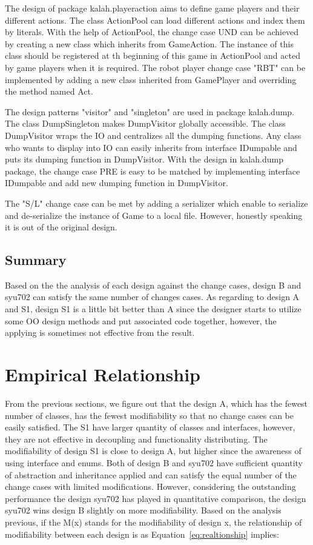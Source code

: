 \documentclass[conference]{IEEEtran}
\begin{document}
	The design of package kalah.playeraction aims to define game players and their different actions. The class ActionPool can load different actions and index them by literals. With the help of ActionPool, the change case UND can be achieved by creating a new class which inherits from GameAction. The instance of this class should be registered at th beginning of this game in ActionPool and acted by game players when it is required. The robot player change case "RBT" can be implemented by adding a new class inherited from GamePlayer and overriding the method named Act.
	
	The design patterns "visitor" and "singleton" are used in package kalah.dump. The class DumpSingleton makes DumpVisitor globally accessible. The class DumpVisitor wraps the IO and centralizes all the dumping functions. Any class who wants to display into IO can easily inherits from interface IDumpable and puts its dumping function in DumpVisitor. With the design in kalah.dump package, the change case PRE is easy to be matched by implementing interface IDumpable and add new dumping function in DumpVisitor.
	
	The "S/L" change case can be met by adding a serializer which enable to serialize and de-serialize the instance of Game to a local file. However, honestly speaking it is out of the original design.
	
	\subsection{Summary}
	Based on the the analysis of each design against the change cases, design B and syu702 can satisfy the same number of changes cases. As regarding to design A and S1, design S1 is a little bit better than A since the designer starts to utilize some \gls{OO} design methods and put associated code together, however, the applying is sometimes not effective from the result.
	
	\section{Empirical Relationship}
	From the previous sections, we figure out that the design A, which has the fewest number of classes, has the fewest modifiability so that no change cases can be easily satisfied. The S1 have larger quantity of classes and interfaces, however, they are not effective in decoupling and functionality distributing. The modifiability of design S1 is close to design A, but higher since the awareness of using interface and enums. Both of design B and syu702 have sufficient quantity of abstraction and inheritance applied and can satisfy the equal number of the change cases with limited modifications. However, considering the outstanding performance the design syu702 has played in quantitative comparison, the design syu702 wins design B slightly on more modifiability.
	Based on the analysis previous, if the M(x) stands for the modifiability of design x, the relationship of modifiability between each design is as Equation~\ref{eq:realtionship} implies:
	
\end{document}

